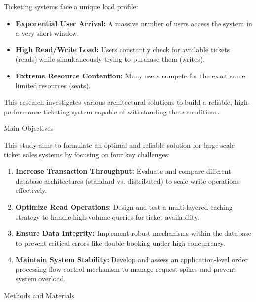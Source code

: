 \documentclass[a0,landscape]{config/poster/a0poster}
\newcommand{\postersection}[1]{%
  \begin{tcolorbox}[
      colback=IEEEblue,
      colframe=IEEEblue,
      fonttitle=\bfseries,
      coltext=white,
      sharp corners,
      boxrule=0pt,
      top=4pt,
      bottom=4pt,
      halign=center
    ]
    \large #1
  \end{tcolorbox}%
}
\begin{document}
\begin{multicols}{4}
	Ticketing systems face a unique load profile:
	\begin{itemize}
		\item \textbf{Exponential User Arrival:} A massive number of users access the system in a very short window.
		\item \textbf{High Read/Write Load:} Users constantly check for available tickets (reads) while simultaneously trying to purchase them (writes).
		\item \textbf{Extreme Resource Contention:} Many users compete for the exact same limited resources (seats).
	\end{itemize}
	This research investigates various architectural solutions to build a reliable, high-performance ticketing system capable of withstanding these conditions.


	\postersection{Main Objectives}
	This study aims to formulate an optimal and reliable solution for large-scale ticket sales systems by focusing on four key challenges:
	\begin{enumerate}
		\item \textbf{Increase Transaction Throughput:} Evaluate and compare different database architectures (standard vs. distributed) to scale write operations effectively.
		\item \textbf{Optimize Read Operations:} Design and test a multi-layered caching strategy to handle high-volume queries for ticket availability.
		\item \textbf{Ensure Data Integrity:} Implement robust mechanisms within the database to prevent critical errors like double-booking under high concurrency.
		\item \textbf{Maintain System Stability:} Develop and assess an application-level order processing flow control mechanism to manage request spikes and prevent system overload.
	\end{enumerate}


	\postersection{Methods and Materials}

\end{multicols}
\end{document}
